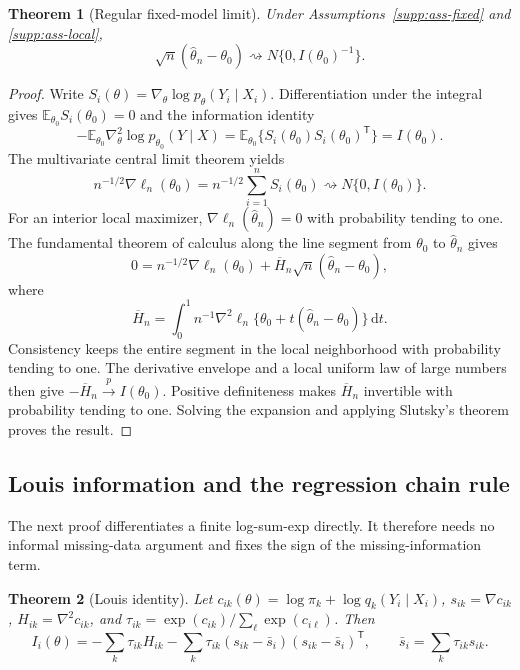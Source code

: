 \documentclass[a4paper,fleqn]{cas-sc}
\newtheorem{theorem}{Theorem}[section]
\newcommand{\E}{\mathbb E}
\newcommand{\T}{\mathsf T}
\numberwithin{equation}{section}
\begin{document}
\begin{theorem}[Regular fixed-model limit]
\label{supp:thm-normal}
Under Assumptions~\ref{supp:ass-fixed} and \ref{supp:ass-local},
\[
 \sqrt n(\widehat\theta_n-\theta_0)
 \rightsquigarrow N\{0,I(\theta_0)^{-1}\}.
\]
\end{theorem}

\begin{proof}
Write $S_i(\theta)=\nabla_\theta\log p_\theta(Y_i\mid X_i)$. Differentiation under the integral gives $\E_{\theta_0}S_i(\theta_0)=0$ and the information identity
\[
 -\E_{\theta_0}\nabla_\theta^2\log p_{\theta_0}(Y\mid X)
 =\E_{\theta_0}\{S_i(\theta_0)S_i(\theta_0)^\T\}
 =I(\theta_0).
\]
The multivariate central limit theorem yields
\[
 n^{-1/2}\nabla\ell_n(\theta_0)
 =n^{-1/2}\sum_{i=1}^nS_i(\theta_0)
 \rightsquigarrow N\{0,I(\theta_0)\}.
\]
For an interior local maximizer, $\nabla\ell_n(\widehat\theta_n)=0$ with probability tending to one. The fundamental theorem of calculus along the line segment from $\theta_0$ to $\widehat\theta_n$ gives
\[
 0=n^{-1/2}\nabla\ell_n(\theta_0)
 +\overline H_n
 \sqrt n(\widehat\theta_n-\theta_0),
\]
where
\[
 \overline H_n=
 \int_0^1 n^{-1}\nabla^2\ell_n
 \{\theta_0+t(\widehat\theta_n-\theta_0)\}\,\mathrm dt.
\]
Consistency keeps the entire segment in the local neighborhood with probability tending to one. The derivative envelope and a local uniform law of large numbers then give $-\overline H_n\xrightarrow{p}I(\theta_0)$. Positive definiteness makes $\overline H_n$ invertible with probability tending to one. Solving the expansion and applying Slutsky's theorem proves the result.
\end{proof}

\subsection{Louis information and the regression chain rule}

The next proof differentiates a finite log-sum-exp directly. It therefore needs no informal missing-data argument and fixes the sign of the missing-information term.

\begin{theorem}[Louis identity]
\label{supp:thm-louis}
Let $c_{ik}(\theta)=\log\pi_k+\log q_k(Y_i\mid X_i)$,
$s_{ik}=\nabla c_{ik}$, $H_{ik}=\nabla^2c_{ik}$, and
$\tau_{ik}=\exp(c_{ik})/\sum_\ell\exp(c_{i\ell})$. Then
\[
 I_i(\theta)=-\sum_k\tau_{ik}H_{ik}
 -\sum_k\tau_{ik}(s_{ik}-\bar s_i)(s_{ik}-\bar s_i)^\T,
 \qquad \bar s_i=\sum_k\tau_{ik}s_{ik}.
\]
\end{theorem}
\end{document}
